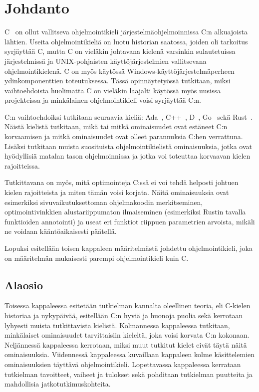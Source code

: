 \section{Johdanto} 

C~\citep{C11} on ollut vallitseva ohjelmointikieli järjestelmäohjelmoinnissa C:n
alkuajoista lähtien. Useita ohjelmointikieliä on luotu historian saatossa,
joiden oli tarkoitus syrjäyttää C, mutta C on vieläkin johtavana kielenä
varsinkin sulautetuissa järjestelmissä ja UNIX-pohjaisten käyttöjärjestelmien
vallitsevana ohjelmointikielenä. C on myös käytössä
Windows-käyttöjärjestelmäperheen ydinkomponenttien toteutuksessa. Tässä
opinnäytetyössä tutkitaan, miksi vaihtoehdoista huolimatta C on vieläkin
laajalti käytössä myös uusissa projekteissa ja minkälainen ohjelmointikieli
voisi syrjäyttää C:n.

C:n vaihtoehdoiksi tutkitaan seuraavia kieliä: Ada~\citep{ADA12},
C++~\citep{CPP14}, D~\citep{D}, Go~\citep{golang} sekä Rust~\citep{rust}.
Näistä kielistä tutkitaan, mikä tai mitkä ominaisuudet ovat estäneet C:n
korvaamisen ja mitkä ominaisuudet ovat olleet parannuksia C:hen verrattuna.
Lisäksi tutkitaan muista suosituista ohjelmointikielistä ominaisuuksia, jotka
ovat hyödyllisiä matalan tason ohjelmoinnissa ja jotka voi toteuttaa korvaavan
kielen rajoitteissa.

Tutkittavana on myös, mitä optimointeja C:ssä ei voi tehdä helposti johtuen
kielen rajoitteista ja miten tämän voisi korjata.
Näitä ominaisuuksia ovat
esimerkiksi sivuvaikutuksettoman ohjelmakoodin merkitseminen,
optimointivinkkien alustariippumaton ilmaiseminen (esimerkiksi Rustin tavalla
funktioiden annotointi) ja useat eri funktiot riippuen parametrien arvoista,
mikäli ne voidaan kääntöaikaisesti päätellä.

Lopuksi esitellään toisen kappaleen määritelmästä johdettu ohjelmointikieli,
joka on määritelmän mukaisesti parempi ohjelmointikieli kuin C.

\subsection{Alaosio}


Toisessa kappaleessa esitetään tutkielman kannalta oleellinen teoria, eli
C-kielen historiaa ja nykypäivää, esitellään C:n hyviä ja huonoja puolia sekä
kerrotaan lyhyesti muista tutkittavista kielistä.
Kolmannessa kappaleessa tutkitaan, minkälaiset ominaisuudet tarvittaisiin
kieleltä, joka voisi korvata C:n kokonaan.
Neljännessä kappaleessa kerrotaan, miksi muut tutkitut kielet eivät täytä näitä
ominaisuuksia.
Viidennessä kappaleessa kuvaillaan kappaleen kolme käsittelemien ominaisuuksien
täyttävä ohjelmointikieli.
Lopettavassa kappaleessa kerrataan tutkielman tavoitteet, vaiheet ja tulokset
sekä pohditaan tutkielman puutteita ja mahdollisia jatkotutkimuskohteita.

